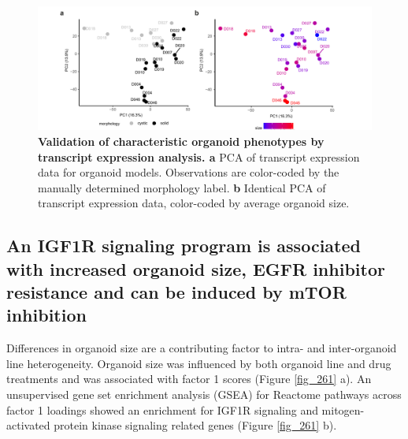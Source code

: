 \begin{flushleft}
\begin{figure}[!h]
\centering
\includegraphics[width=500pt,
                height=\textheight,
                keepaspectratio]{figures/promise/pdf/fig_4_1.pdf}
\caption[Validation of characteristic organoid phenotypes by transcript expression analysis]{\textbf{Validation of characteristic organoid phenotypes by transcript expression analysis. a} PCA of transcript expression data for organoid models. Observations are color-coded by the manually determined morphology label. \textbf{b} Identical PCA of transcript expression data, color-coded by average organoid size.}
\label{fig_241}
\end{figure}


\newpage
\subsection{An IGF1R signaling program is associated with increased organoid size, EGFR inhibitor resistance and can be induced by mTOR inhibition}

Differences in organoid size are a contributing factor to intra- and inter-organoid line heterogeneity. Organoid size was influenced by both organoid line and drug treatments and was associated with factor 1 scores (Figure \ref{fig_261} a). An unsupervised gene set enrichment analysis (GSEA) for Reactome pathways across factor 1 loadings showed an enrichment for IGF1R signaling and mitogen-activated protein kinase signaling related genes (Figure \ref{fig_261} b). 


\end{flushleft}
